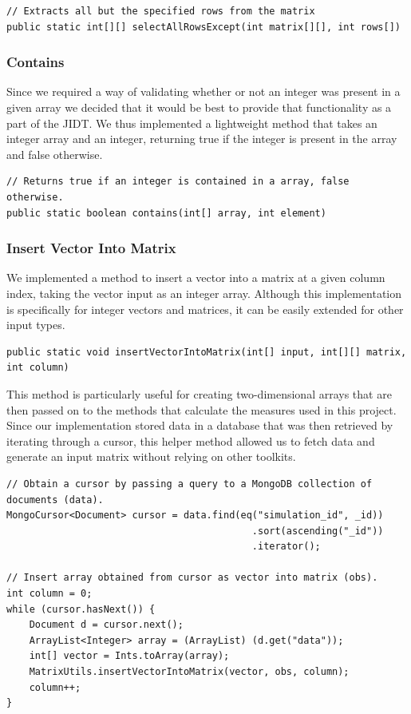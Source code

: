 \documentclass[a4paper,11pt]{article}
\begin{document}
\begin{verbatim}
// Extracts all but the specified rows from the matrix
public static int[][] selectAllRowsExcept(int matrix[][], int rows[])
\end{verbatim}

\subsubsection{Contains}

Since we required a way of validating whether or not an integer was present in a given array we decided that it would be best to provide that functionality as a part of the JIDT. We thus implemented a lightweight method that takes an integer array and an integer, returning true if the integer is present in the array and false otherwise.

\begin{verbatim}
// Returns true if an integer is contained in a array, false otherwise.
public static boolean contains(int[] array, int element)
\end{verbatim}

\subsubsection{Insert Vector Into Matrix}

We implemented a method to insert a vector into a matrix at a given column index, taking the vector input as an integer array. Although this implementation is specifically for integer vectors and matrices, it can be easily extended for other input types.

\begin{verbatim}
public static void insertVectorIntoMatrix(int[] input, int[][] matrix, int column)
\end{verbatim}

This method is particularly useful for creating two-dimensional arrays that are then passed on to the methods that calculate the measures used in this project. Since our implementation stored data in a database that was then retrieved by iterating through a cursor, this helper method allowed us to fetch data and generate an input matrix without relying on other toolkits.

\begin{verbatim}
// Obtain a cursor by passing a query to a MongoDB collection of documents (data).
MongoCursor<Document> cursor = data.find(eq("simulation_id", _id))
                                           .sort(ascending("_id"))
                                           .iterator();

// Insert array obtained from cursor as vector into matrix (obs).
int column = 0;
while (cursor.hasNext()) {
	Document d = cursor.next();
	ArrayList<Integer> array = (ArrayList) (d.get("data"));
	int[] vector = Ints.toArray(array);
	MatrixUtils.insertVectorIntoMatrix(vector, obs, column);
	column++;
}
\end{verbatim}
\end{document}
